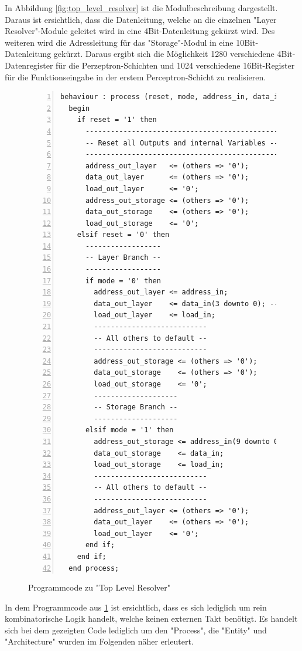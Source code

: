 \documentclass{article}
\numberwithin{equation}{section}
\begin{document}
\FloatBarrier
In Abbildung \ref{fig:top_level_resolver} ist die Modulbeschreibung dargestellt.
Daraus ist ersichtlich, dass die Datenleitung, welche an die einzelnen "Layer Resolver"-Module
geleitet wird in eine 4Bit-Datenleitung gekürzt wird. Des weiteren wird die Adressleitung
für das "Storage"-Modul in eine 10Bit-Datenleitung gekürzt. Daraus ergibt sich die Möglichkeit
1280 verschiedene 4Bit-Datenregister für die Perzeptron-Schichten und 1024 verschiedene
16Bit-Register für die Funktionseingabe in der erstem Perceptron-Schicht zu realisieren.
\begin{figure}[htbp]
\begin{lstlisting}[style=VHDL,numbers=left,stepnumber=1,basicstyle=\footnotesize]
behaviour : process (reset, mode, address_in, data_in, load_in) is
  begin
    if reset = '1' then
      ----------------------------------------------
      -- Reset all Outputs and internal Variables --
      ----------------------------------------------
      address_out_layer   <= (others => '0');
      data_out_layer      <= (others => '0');
      load_out_layer      <= '0';
      address_out_storage <= (others => '0');
      data_out_storage    <= (others => '0');
      load_out_storage    <= '0';
    elsif reset = '0' then
      ------------------
      -- Layer Branch --
      ------------------
      if mode = '0' then
        address_out_layer <= address_in;
        data_out_layer    <= data_in(3 downto 0); -- least significant bits
        load_out_layer    <= load_in;
        ---------------------------
        -- All others to default --
        ---------------------------
        address_out_storage <= (others => '0');
        data_out_storage    <= (others => '0');
        load_out_storage    <= '0';
        --------------------
        -- Storage Branch --
        --------------------
      elsif mode = '1' then
        address_out_storage <= address_in(9 downto 0); -- least significant bits
        data_out_storage    <= data_in;
        load_out_storage    <= load_in;
        ---------------------------
        -- All others to default --
        ---------------------------
        address_out_layer <= (others => '0');
        data_out_layer    <= (others => '0');
        load_out_layer    <= '0';
      end if;
    end if;
  end process;
\end{lstlisting}
\caption{Programmcode zu "Top Level Resolver"} \label{code:top_level_resolver}
\end{figure}
\FloatBarrier
In dem Programmcode aus \ref{code:top_level_resolver} ist ersichtlich, dass es sich lediglich
um rein kombinatorische Logik handelt, welche keinen externen Takt benötigt. Es handelt 
sich bei dem gezeigten Code lediglich um den "Process", die "Entity" und "Architecture"
wurden im Folgenden näher erleutert.
\pagebreak
\end{document}

